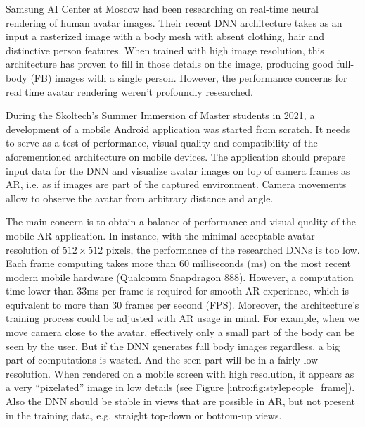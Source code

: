 Samsung AI Center at Moscow had been researching on real-time neural rendering of human avatar images. Their recent DNN architecture \cite{dnn:stylepeople21} takes as an input a rasterized image with a body mesh with absent clothing, hair and distinctive person features. When trained with high image resolution, this architecture has proven to fill in those details on the image, producing good full-body (FB) images with a single person. However, the performance concerns for real time avatar rendering weren't profoundly researched.
 

During the Skoltech's Summer Immersion of Master students in 2021, a development of a mobile Android application was started from scratch. It needs to serve as a test of performance, visual quality and compatibility of the aforementioned architecture on mobile devices. The application should prepare input data for the DNN and visualize avatar images on top of camera frames as AR, i.e. as if images are part of the captured environment. Camera movements allow to observe the avatar from arbitrary distance and angle.
 
The main concern is to obtain a balance of performance and visual quality of the mobile AR application. In instance, with the minimal acceptable avatar resolution of $512\times512$ pixels, the performance of the researched DNNs is too low. Each frame computing takes more than 60 milliseconds (ms) on the most recent modern mobile hardware (Qualcomm Snapdragon 888). However, a computation time lower than 33ms per frame is required for smooth AR experience, which is equivalent to more than 30 frames per second (FPS). Moreover, the architecture's training process could be adjusted with AR usage in mind. For example, when we move camera close to the avatar, effectively only a small part of the body can be seen by the user. But if the DNN generates full body images regardless, a big part of computations is wasted. And the seen part will be in a fairly low resolution. When rendered on a mobile screen with high resolution, it appears as a very ``pixelated'' image in low details (see Figure \ref{intro:fig:stylepeople_frame}\protect{}). Also the DNN should be stable in views that are possible in AR, but not present in the training data, e.g. straight top-down or bottom-up views. 

